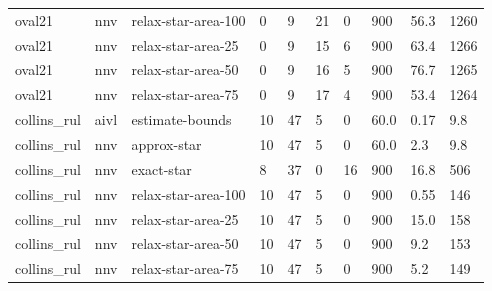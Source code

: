 \begin{table}[t]
\begin{tabular}{llllllllll}
oval21 & nnv & relax-star-area-100 & 0 & 9 & 21 & 0 & 900 & 56.3 & 1260 \\
oval21 & nnv & relax-star-area-25 & 0 & 9 & 15 & 6 & 900 & 63.4 & 1266 \\
oval21 & nnv & relax-star-area-50 & 0 & 9 & 16 & 5 & 900 & 76.7 & 1265 \\
oval21 & nnv & relax-star-area-75 & 0 & 9 & 17 & 4 & 900 & 53.4 & 1264 \\
collins_rul & aivl & estimate-bounds & 10 & 47 & 5 & 0 & 60.0 & 0.17 & 9.8 \\
collins_rul & nnv & approx-star & 10 & 47 & 5 & 0 & 60.0 & 2.3 & 9.8 \\
collins_rul & nnv & exact-star & 8 & 37 & 0 & 16 & 900 & 16.8 & 506 \\
collins_rul & nnv & relax-star-area-100 & 10 & 47 & 5 & 0 & 900 & 0.55 & 146 \\
collins_rul & nnv & relax-star-area-25 & 10 & 47 & 5 & 0 & 900 & 15.0 & 158 \\
collins_rul & nnv & relax-star-area-50 & 10 & 47 & 5 & 0 & 900 & 9.2 & 153 \\
collins_rul & nnv & relax-star-area-75 & 10 & 47 & 5 & 0 & 900 & 5.2 & 149 \\
\bottomrule
\end{tabular}
\end{table}
